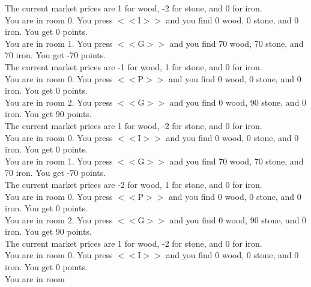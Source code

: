 \documentclass[pdflatex,sn-nature]{sn-jnl}%
\theoremstyle{thmstyleone}%
\theoremstyle{thmstyletwo}%
\theoremstyle{thmstylethree}%
\begin{document}
The current market prices are 1 for wood, -2 for stone, and 0 for iron. $~$\\ 
You are in room 0. You press $<<$I$>>$ and you find 0 wood, 0 stone, and 0 iron. You get 0 points. $~$\\ 
You are in room 1. You press $<<$G$>>$ and you find 70 wood, 70 stone, and 70 iron. You get -70 points. $~$\\ 
The current market prices are -1 for wood, 1 for stone, and 0 for iron. $~$\\ 
You are in room 0. You press $<<$P$>>$ and you find 0 wood, 0 stone, and 0 iron. You get 0 points. $~$\\ 
You are in room 2. You press $<<$G$>>$ and you find 0 wood, 90 stone, and 0 iron. You get 90 points. $~$\\ 
The current market prices are 1 for wood, -2 for stone, and 0 for iron. $~$\\ 
You are in room 0. You press $<<$I$>>$ and you find 0 wood, 0 stone, and 0 iron. You get 0 points. $~$\\ 
You are in room 1. You press $<<$G$>>$ and you find 70 wood, 70 stone, and 70 iron. You get -70 points. $~$\\ 
The current market prices are -2 for wood, 1 for stone, and 0 for iron. $~$\\ 
You are in room 0. You press $<<$P$>>$ and you find 0 wood, 0 stone, and 0 iron. You get 0 points. $~$\\ 
You are in room 2. You press $<<$G$>>$ and you find 0 wood, 90 stone, and 0 iron. You get 90 points. $~$\\ 
The current market prices are 1 for wood, -2 for stone, and 0 for iron. $~$\\ 
You are in room 0. You press $<<$I$>>$ and you find 0 wood, 0 stone, and 0 iron. You get 0 points. $~$\\ 
You are in room  
\end{document}
